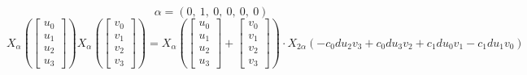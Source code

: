 \documentclass[11pt]{article}
\theoremstyle{definition}
\begin{document}
\[
\alpha = \left( 0, \  1, \  0, \  0, \  0, \  0\right)
\]
\[
X_{\alpha}\left(\left[\begin{matrix}u_{0}\\u_{1}\\u_{2}\\u_{3}\end{matrix}\right]\right) X_{\alpha}\left(\left[\begin{matrix}v_{0}\\v_{1}\\v_{2}\\v_{3}\end{matrix}\right]\right) = X_{\alpha}\left(\left[\begin{matrix}u_{0}\\u_{1}\\u_{2}\\u_{3}\end{matrix}\right] + \left[\begin{matrix}v_{0}\\v_{1}\\v_{2}\\v_{3}\end{matrix}\right]\right) \cdot X_{2\alpha}\left(- c_{0} d u_{2} v_{3} + c_{0} d u_{3} v_{2} + c_{1} d u_{0} v_{1} - c_{1} d u_{1} v_{0}\right)
\]
\end{document}

